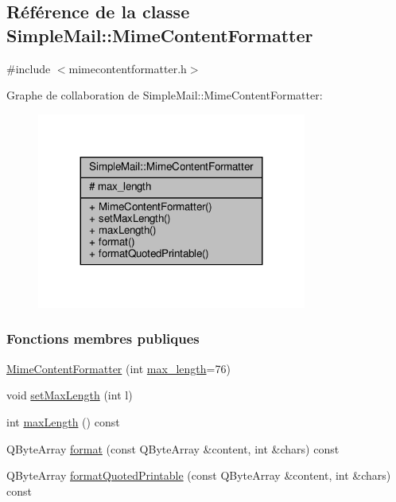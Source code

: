 \hypertarget{class_simple_mail_1_1_mime_content_formatter}{}\subsection{Référence de la classe Simple\+Mail\+:\+:Mime\+Content\+Formatter}
\label{class_simple_mail_1_1_mime_content_formatter}


{\ttfamily \#include $<$mimecontentformatter.\+h$>$}



Graphe de collaboration de Simple\+Mail\+:\+:Mime\+Content\+Formatter\+:\nopagebreak
\begin{figure}[H]
\begin{center}
\leavevmode
\includegraphics[width=251pt]{class_simple_mail_1_1_mime_content_formatter__coll__graph}
\end{center}
\end{figure}
\subsubsection*{Fonctions membres publiques}
\begin{DoxyCompactItemize}
\item 
\hyperlink{class_simple_mail_1_1_mime_content_formatter_a69caccbcd231c7e84160415ed16f639b}{Mime\+Content\+Formatter} (int \hyperlink{class_simple_mail_1_1_mime_content_formatter_a5c7278fb3bd794bc4ff408169cfef6fd}{max\+\_\+length}=76)
\item 
void \hyperlink{class_simple_mail_1_1_mime_content_formatter_af982d5e4c2fd25d72ef45a3b69f99593}{set\+Max\+Length} (int l)
\item 
int \hyperlink{class_simple_mail_1_1_mime_content_formatter_a47f6976ee76be112da5dd610c7862d4b}{max\+Length} () const
\item 
Q\+Byte\+Array \hyperlink{class_simple_mail_1_1_mime_content_formatter_ac36a08fb6878efb0a6450170ebfc8766}{format} (const Q\+Byte\+Array \&content, int \&chars) const
\item 
Q\+Byte\+Array \hyperlink{class_simple_mail_1_1_mime_content_formatter_ae1f9eff05be2538bf6b3210fbab4b75a}{format\+Quoted\+Printable} (const Q\+Byte\+Array \&content, int \&chars) const
\end{DoxyCompactItemize}
